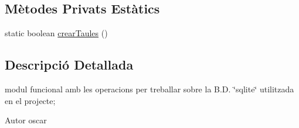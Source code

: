 \subsection*{Mètodes Privats Estàtics}
\begin{DoxyCompactItemize}
\item 
static boolean \hyperlink{classdades_1_1_b_d_a7049b625a7b791b7fcf4859487eba09f}{crear\+Taules} ()
\end{DoxyCompactItemize}


\subsection{Descripció Detallada}
modul funcional amb les operacions per treballar sobre la B.\+D. \char`\"{}sqlite\char`\"{} utilitzada en el projecte; 

\begin{DoxyAuthor}{Autor}
oscar 
\end{DoxyAuthor}


